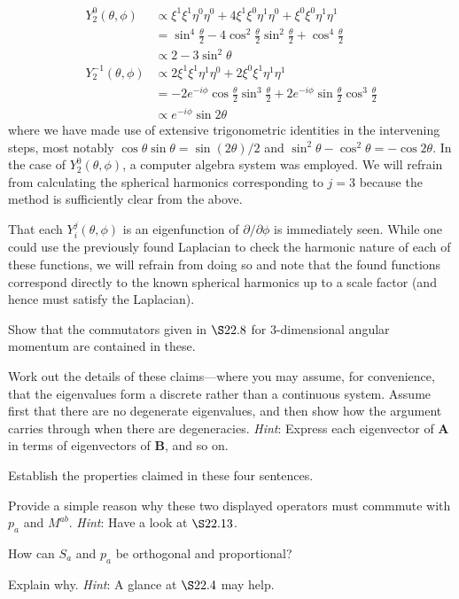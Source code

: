 \documentclass[../road-to-reality.tex]{subfiles}
\begin{document}
\begin{questions}
\begin{solution}
\begin{align*}
		Y_{2}^0(\theta, \phi) &\propto \xi^{1}\xi^{1}\eta^0\eta^0 + 4\xi^1\xi^0\eta^1\eta^0 + \xi^0\xi^0\eta^1\eta^1 \\
		&= \sin^4\tfrac{\theta}{2} - 4\cos^2\tfrac{\theta}{2}\sin^2\tfrac{\theta}{2} + \cos^4\tfrac{\theta}{2} \\
		&\propto 2 - 3\sin^2\theta \\
		Y_{2}^{-1}(\theta, \phi) &\propto 2\xi^1\xi^1\eta^1\eta^0 + 2\xi^0\xi^1\eta^1\eta^1 \\
		&= -2e^{-i\phi}\cos\tfrac{\theta}{2}\sin^3\tfrac{\theta}{2} + 2e^{-i\phi}\sin\tfrac{\theta}{2}\cos^3\tfrac{\theta}{2} \\
		&\propto e^{-i\phi}\sin2\theta
	\end{align*}
	where we have made use of extensive trigonometric identities in the intervening steps, most notably $\cos\theta\sin\theta = \sin(2\theta)/2$ and $\sin^2\theta - \cos^2\theta = {-\cos2\theta}$. In the case of $Y_{2}^{0}(\theta, \phi)$, a computer algebra system was employed. We will refrain from calculating the spherical harmonics corresponding to $j=3$ because the method is sufficiently clear from the above.
	
	That each $Y_{i}^{j}(\theta, \phi)$ is an eigenfunction of $\partial/\partial\phi$ is immediately seen. While one could use the previously found Laplacian to check the harmonic nature of each of these functions, we will refrain from doing so and note that the found functions correspond directly to the known spherical harmonics up to a scale factor (and hence must satisfy the Laplacian).
\end{solution}

\question Show that the commutators given in $\S 22.8$ for $3$-dimensional angular momentum are contained in these.

\question Work out the details of these claims---where you may assume, for convenience, that the eigenvalues form a discrete rather than a continuous system. Assume first that there are no degenerate eigenvalues, and then show how the argument carries through when there are degeneracies. \textit{Hint}: Express each eigenvector of $\mathbf{A}$ in terms of eigenvectors of $\mathbf{B}$, and so on.

\question Establish the properties claimed in these four sentences.

\question Provide a simple reason why these two displayed operators must commmute with $p_a$ and $M^{ab}$. \textit{Hint}: Have a look at $\S 22.13$.

\question How can $S_a$ and $p_a$ be orthogonal and proportional?

\question Explain why. \textit{Hint}: A glance at $\S 22.4$ may help.

\end{questions}
	
\end{document}
